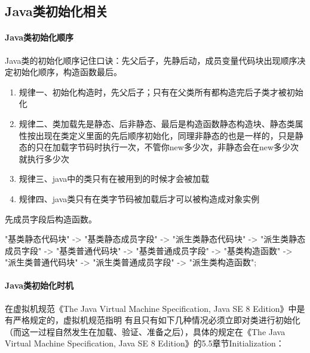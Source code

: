 \documentclass[../../../interview-questions.tex]{subfiles}
\begin{document}
\subsection{Java类初始化相关}

\paragraph{Java类初始化顺序}

Java类的初始化顺序记住口诀：先父后子，先静后动，成员变量代码块出现顺序决定初始化顺序，构造函数最后。

\begin{enumerate}
\item{规律一、初始化构造时，先父后子；只有在父类所有都构造完后子类才被初始化}
\item{规律二、类加载先是静态、后非静态、最后是构造函数}静态构造块、静态类属性按出现在类定义里面的先后顺序初始化，同理非静态的也是一样的，只是静态的只在加载字节码时执行一次，不管你new多少次，非静态会在new多少次就执行多少次
\item{规律三、java中的类只有在被用到的时候才会被加载}
\item{规律四、java类只有在类字节码被加载后才可以被构造成对象实例}
\end{enumerate}

先成员字段后构造函数。

"基类静态代码块" -> "基类静态成员字段" -> "派生类静态代码块"
    -> "派生类静态成员字段" -> "基类普通代码块" -> "基类普通成员字段"
    -> "基类构造函数" -> "派生类普通代码块"
    -> "派生类普通成员字段" -> "派生类构造函数";

\paragraph{Java类初始化时机}
    
在虚拟机规范《The Java Virtual Machine Specification, Java SE 8 Edition》中是有严格规定的，虚拟机规范指明 有且只有如下几种情况必须立即对类进行初始化（而这一过程自然发生在加载、验证、准备之后），具体的规定在《The Java Virtual Machine Specification, Java SE 8 Edition》的5.5章节Initialization：
\end{document}
